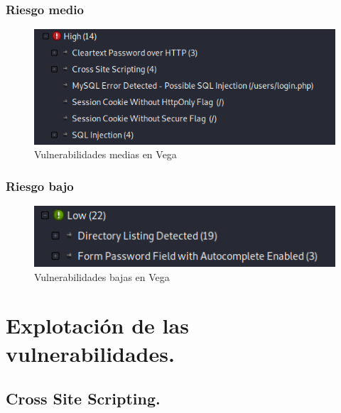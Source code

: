 \documentclass[12pt,twoside]{article}
\begin{document}
\subsubsection{Riesgo medio}
\begin{figure}[H]
    \centering
    \includegraphics[scale=0.8]{./imagenes/riesgo_alto}
    \caption{Vulnerabilidades medias en Vega}
\end{figure}
\subsubsection{Riesgo bajo}
\begin{figure}[H]
    \centering
    \includegraphics[scale=0.8]{./imagenes/riesgo_bajo}
    \caption{Vulnerabilidades bajas en Vega}
\end{figure}
\newpage

\newpage
\section{Explotación de las vulnerabilidades.}
\subsection{Cross Site Scripting.}
\end{document}
